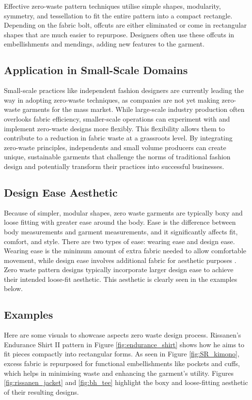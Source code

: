 Effective zero-waste pattern techniques utilise simple shapes, modularity, symmetry, and tessellation to fit the entire pattern into a compact rectangle. Depending on the fabric bolt, offcuts are either eliminated or come in rectangular shapes that are much easier to repurpose. Designers often use these offcuts in embellishments and mendings, adding new features to the garment.

\subsection{Application in Small-Scale Domains}
Small-scale practices like independent fashion designers are currently leading the way in adopting zero-waste techniques, as companies are not yet making zero-waste garments for the mass market. While large-scale industry production often overlooks fabric efficiency, smaller-scale operations can experiment with and implement zero-waste designs more flexibly. This flexibility allows them to contribute to a reduction in fabric waste at a grassroots level. By integrating zero-waste principles, independents and small volume producers can create unique, sustainable garments that challenge the norms of traditional fashion design and potentially transform their practices into successful businesses.

\subsection{Design Ease Aesthetic}
Because of simpler, modular shapes, zero waste garments are typically boxy and loose fitting with greater ease around the body. Ease is the difference between body measurements and garment measurements, and it significantly affects fit, comfort, and style. There are two types of ease: wearing ease and design ease. Wearing ease is the minimum amount of extra fabric needed to allow comfortable movement, while design ease involves additional fabric for aesthetic purposes \cite{tessa_what_2022}. Zero waste pattern designs typically incorporate larger design ease to achieve their intended loose-fit aesthetic. This aesthetic is clearly seen in the examples below.

\subsection{Examples}
Here are some visuals to showcase aspects zero waste design process. Rissanen's Endurance Shirt II pattern in Figure \ref{fig:endurance_shirt} shows how he aims to fit pieces compactly into rectangular forms. As seen in Figure \ref{fig:SR_kimono}, excess fabric is repurposed for functional embellishments like pockets and cuffs, which helps in minimising waste and enhancing the garment's utility. Figures \ref{fig:rissanen_jacket} and \ref{fig:bh_tee} highlight the boxy and loose-fitting aesthetic of their resulting designs.

